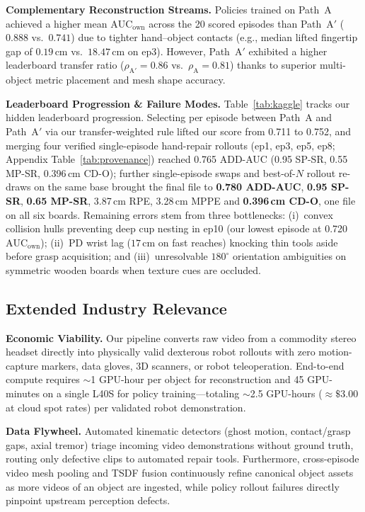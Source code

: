 \documentclass[10pt]{nvidiaextabstract}
\newcommand{\ownauc}{\ensuremath{\mathrm{AUC}_{\text{own}}}\xspace}
\begin{document}
\textbf{Complementary Reconstruction Streams.} Policies trained on Path~A achieved a higher mean $\ownauc$ across the 20 scored episodes than Path~A$'$ ($0.888$ vs.\ $0.741$) due to tighter hand--object contacts (e.g., median lifted fingertip gap of $0.19$\,cm vs.\ $18.47$\,cm on ep3). However, Path~A$'$ exhibited a higher leaderboard transfer ratio ($\rho_{\text{A}'}=0.86$ vs.\ $\rho_{\text{A}}=0.81$) thanks to superior multi-object metric placement and mesh shape accuracy.

\textbf{Leaderboard Progression \& Failure Modes.} Table~\ref{tab:kaggle} tracks our hidden leaderboard progression. Selecting per episode between Path~A and Path~A$'$ via our transfer-weighted rule lifted our score from 0.711 to 0.752, and merging four verified single-episode hand-repair rollouts (ep1, ep3, ep5, ep8; Appendix Table~\ref{tab:provenance}) reached 0.765 ADD-AUC (0.95 SP-SR, 0.55 MP-SR, 0.396\,cm CD-O); further single-episode swaps and best-of-$N$ rollout re-draws on the same base brought the final file to \textbf{0.780 ADD-AUC}, \textbf{0.95 SP-SR}, \textbf{0.65 MP-SR}, 3.87\,cm RPE, 3.28\,cm MPPE and \textbf{0.396\,cm CD-O}, one file on all six boards. Remaining errors stem from three bottlenecks: (i)~convex collision hulls preventing deep cup nesting in ep10 (our lowest episode at 0.720 \ownauc); (ii)~PD wrist lag ($17$\,cm on fast reaches) knocking thin tools aside before grasp acquisition; and (iii)~unresolvable $180^\circ$ orientation ambiguities on symmetric wooden boards when texture cues are occluded.

\subsection{Extended Industry Relevance}
\label{app:detail-industry}
\textbf{Economic Viability.} Our pipeline converts raw video from a commodity stereo headset directly into physically valid dexterous robot rollouts with zero motion-capture markers, data gloves, 3D scanners, or robot teleoperation. End-to-end compute requires $\sim$1 GPU-hour per object for reconstruction and 45 GPU-minutes on a single L40S for policy training—totaling $\sim$2.5 GPU-hours ($\approx\$3.00$ at cloud spot rates) per validated robot demonstration.

\textbf{Data Flywheel.} Automated kinematic detectors (ghost motion, contact/grasp gaps, axial tremor) triage incoming video demonstrations without ground truth, routing only defective clips to automated repair tools. Furthermore, cross-episode video mesh pooling and TSDF fusion continuously refine canonical object assets as more videos of an object are ingested, while policy rollout failures directly pinpoint upstream perception defects.
\end{document}
